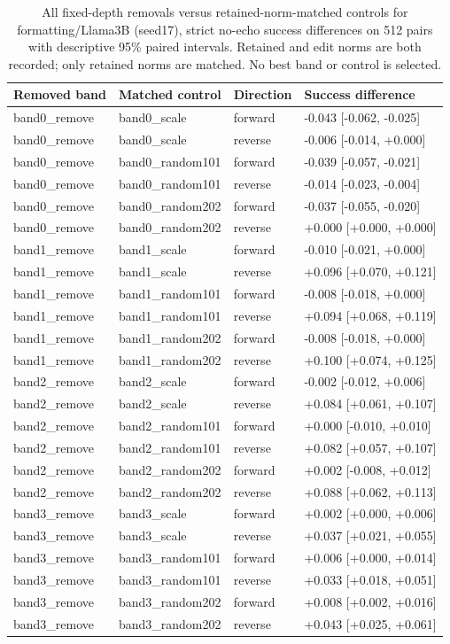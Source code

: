 \begin{table}[t]
\centering\small
\begin{tabular}{llll}
\toprule
Removed band & Matched control & Direction & Success difference \\
\midrule
band0\_remove & band0\_scale & forward & -0.043 [-0.062, -0.025] \\
band0\_remove & band0\_scale & reverse & -0.006 [-0.014, +0.000] \\
band0\_remove & band0\_random101 & forward & -0.039 [-0.057, -0.021] \\
band0\_remove & band0\_random101 & reverse & -0.014 [-0.023, -0.004] \\
band0\_remove & band0\_random202 & forward & -0.037 [-0.055, -0.020] \\
band0\_remove & band0\_random202 & reverse & +0.000 [+0.000, +0.000] \\
band1\_remove & band1\_scale & forward & -0.010 [-0.021, +0.000] \\
band1\_remove & band1\_scale & reverse & +0.096 [+0.070, +0.121] \\
band1\_remove & band1\_random101 & forward & -0.008 [-0.018, +0.000] \\
band1\_remove & band1\_random101 & reverse & +0.094 [+0.068, +0.119] \\
band1\_remove & band1\_random202 & forward & -0.008 [-0.018, +0.000] \\
band1\_remove & band1\_random202 & reverse & +0.100 [+0.074, +0.125] \\
band2\_remove & band2\_scale & forward & -0.002 [-0.012, +0.006] \\
band2\_remove & band2\_scale & reverse & +0.084 [+0.061, +0.107] \\
band2\_remove & band2\_random101 & forward & +0.000 [-0.010, +0.010] \\
band2\_remove & band2\_random101 & reverse & +0.082 [+0.057, +0.107] \\
band2\_remove & band2\_random202 & forward & +0.002 [-0.008, +0.012] \\
band2\_remove & band2\_random202 & reverse & +0.088 [+0.062, +0.113] \\
band3\_remove & band3\_scale & forward & +0.002 [+0.000, +0.006] \\
band3\_remove & band3\_scale & reverse & +0.037 [+0.021, +0.055] \\
band3\_remove & band3\_random101 & forward & +0.006 [+0.000, +0.014] \\
band3\_remove & band3\_random101 & reverse & +0.033 [+0.018, +0.051] \\
band3\_remove & band3\_random202 & forward & +0.008 [+0.002, +0.016] \\
band3\_remove & band3\_random202 & reverse & +0.043 [+0.025, +0.061] \\
\bottomrule
\end{tabular}
\caption{All fixed-depth removals versus retained-norm-matched controls for formatting/Llama3B (seed17), strict no-echo success differences on 512 pairs with descriptive 95\% paired intervals. Retained and edit norms are both recorded; only retained norms are matched. No best band or control is selected.}
\label{tab:sprint-layer-controls}
\end{table}
